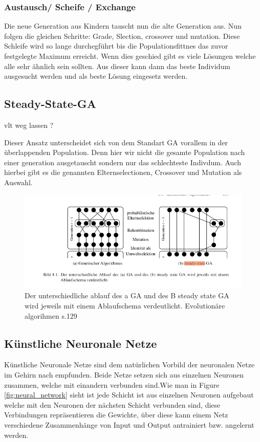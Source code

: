 \subsubsection{Austausch/ Scheife / Exchange}
Die neue Generation aus Kindern tauscht nun die alte Generation aus. Nun folgen die gleichen Schritte: Grade, Slection, crossover und mutation. 
Diese Schleife wird so lange durchegführt bis die Populationsfittnes das zuvor festgelegte Maximum erreicht. Wenn dies geschied gibt es viele Lösungen welche alle sehr ähnlich sein sollten. Aus dieser kann dann das beste Individum ausgesucht werden und als beste Lösung eingesetz werden. 

\subsection{Steady-State-GA} \label{Steady-State-GA}

vlt weg lassen ?

Dieser Ansatz unterscheidet sich von dem Standart GA vorallem in der überlappenden Population. Denn hier wir nicht die gesamte Population nach einer generation ausgetauscht sondern nur das schlechteste Indivdum. Auch hierbei gibt es die genannten Elternselectionen, Crossover und Mutation als Auswahl. 
\noindent%
\begin{figure}[H]
  \centering  
  \includegraphics[scale=0.5]{img/gavssteady-state.png}
  \caption{Der unterschiedliche ablauf des a GA und des B steady state GA wird jeweils mit einem Ablaufschema verdeutlicht. Evolutionäre algorihmen s.129 }
  \label{fig:chromosome}
\end{figure}

\newpage

\subsection{Künstliche Neuronale Netze}

Künstliche Neuronale Netze sind dem natürlichen Vorbild der neuronalen Netze im Gehirn nach empfunden. Beide Netze setzen sich aus einzelnen Neuronen zusammen, welche mit einandern verbunden sind.Wie man in Figure \ref{fig:neural_network} sieht ist jede Schicht ist aus einzelnen Neuronen aufgebaut welche mit den Neuronen der nächsten Schicht verbunden sind, diese Verbindungen repräsentieren die Gewichte, über diese kann einem Netz verschiedene Zusammenhänge von Input und Output antrainiert bzw. angelernt werden.

